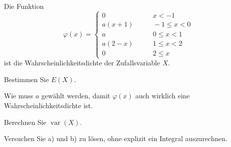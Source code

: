 Die Funktion
\begin{equation}
\varphi(x)
=
\begin{cases}
0&\qquad x < -1\\
a(x+1) &\qquad -1 \le x < 0\\
a&\qquad 0 \le x < 1\\
a(2-x) &\qquad 1 \le x < 2\\
0&\qquad 2 \le x
\end{cases}
\end{equation}
ist die Wahrscheinlichkeitsdichte der Zufallsvariable $X$.
\begin{teilaufgaben}
\item Bestimmen Sie $E(X)$.
\item Wie muss $a$ gewählt werden, damit $\varphi(x)$ auch wirklich eine 
Wahrscheinlichkeitsdichte ist.
\item Berechnen Sie $\operatorname{var}(X)$.
\end{teilaufgaben}

\begin{hinweis}
Versuchen Sie a) und b) zu lösen, ohne explizit ein Integral auszurechnen.
\end{hinweis}

\begin{center}
\end{center}

